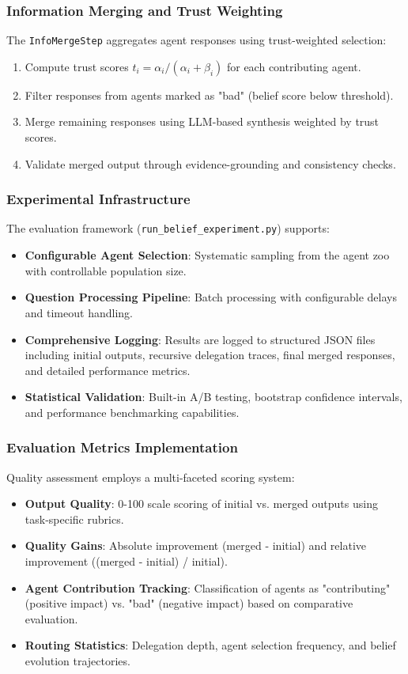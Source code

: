   \subsubsection{Information Merging and Trust Weighting}
  The \texttt{InfoMergeStep} aggregates agent responses using trust-weighted selection:
  \begin{enumerate}[leftmargin=1.4em]
      \item Compute trust scores $t_i = \alpha_i / (\alpha_i + \beta_i)$ for each contributing agent.
      \item Filter responses from agents marked as "bad" (belief score below threshold).
      \item Merge remaining responses using LLM-based synthesis weighted by trust scores.
      \item Validate merged output through evidence-grounding and consistency checks.
  \end{enumerate}

  \subsubsection{Experimental Infrastructure}
  The evaluation framework (\texttt{run\_belief\_experiment.py}) supports:
  \begin{itemize}[leftmargin=1.4em]
      \item \textbf{Configurable Agent Selection}: Systematic sampling from the agent zoo with controllable population size.
      \item \textbf{Question Processing Pipeline}: Batch processing with configurable delays and timeout handling.
      \item \textbf{Comprehensive Logging}: Results are logged to structured JSON files including initial outputs, recursive delegation traces, final merged responses, and detailed performance metrics.
      \item \textbf{Statistical Validation}: Built-in A/B testing, bootstrap confidence intervals, and performance benchmarking capabilities.
  \end{itemize}

  \subsubsection{Evaluation Metrics Implementation}
  Quality assessment employs a multi-faceted scoring system:
  \begin{itemize}[leftmargin=1.4em]
      \item \textbf{Output Quality}: 0-100 scale scoring of initial vs. merged outputs using task-specific rubrics.
      \item \textbf{Quality Gains}: Absolute improvement (merged - initial) and relative improvement ((merged - initial) / initial).
      \item \textbf{Agent Contribution Tracking}: Classification of agents as "contributing" (positive impact) vs. "bad" (negative impact) based on comparative evaluation.
      \item \textbf{Routing Statistics}: Delegation depth, agent selection frequency, and belief evolution trajectories.
  \end{itemize}

